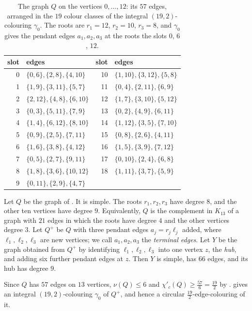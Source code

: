 \documentclass[11pt,colorlinks]{charlie}
\newcommand{\cind}{\chi'_c}
\begin{document}
\begin{table}[ht]
\centering\small
\begin{tabular}{@{}r l @{\qquad} r l@{}}
\toprule
slot & edges & slot & edges \\
\midrule
0 & $\{0,6\},\{2,8\},\{4,10\}$ & 10 & $\{1,10\},\{3,12\},\{5,8\}$ \\
1 & $\{1,9\},\{3,11\},\{5,7\}$ & 11 & $\{0,4\},\{2,11\},\{6,9\}$ \\
2 & $\{2,12\},\{4,8\},\{6,10\}$ & 12 & $\{1,7\},\{3,10\},\{5,12\}$ \\
3 & $\{0,3\},\{5,11\},\{7,9\}$ & 13 & $\{0,2\},\{4,9\},\{6,11\}$ \\
4 & $\{1,4\},\{6,12\},\{8,10\}$ & 14 & $\{1,12\},\{3,5\},\{7,10\}$ \\
5 & $\{0,9\},\{2,5\},\{7,11\}$ & 15 & $\{0,8\},\{2,6\},\{4,11\}$ \\
6 & $\{1,6\},\{3,8\},\{4,12\}$ & 16 & $\{1,5\},\{3,9\},\{7,12\}$ \\
7 & $\{0,5\},\{2,7\},\{9,11\}$ & 17 & $\{0,10\},\{2,4\},\{6,8\}$ \\
8 & $\{1,8\},\{3,6\},\{10,12\}$ & 18 & $\{1,11\},\{3,7\},\{5,9\}$ \\
9 & $\{0,11\},\{2,9\},\{4,7\}$ & & \\
\bottomrule
\end{tabular}
\caption{The graph $Q$ on the vertices $0,\dots,12$: its $57$ edges, arranged in the $19$ colour classes of the integral $(19,2)$-colouring $\gamma_0$. The roots are $r_1=12$, $r_2=10$, $r_3=8$, and $\gamma_0$ gives the pendant edges $a_1,a_2,a_3$ at the roots the slots $0$, $6$, $12$.}
\label{tab:core}
\end{table}

Let $Q$ be the graph of . It is simple. The roots $r_1,r_2,r_3$ have degree $8$, and the other ten vertices have degree $9$. Equivalently, $Q$ is the complement in $K_{13}$ of a graph with $21$ edges in which the roots have degree $4$ and the other vertices degree $3$. Let $Q^+$ be $Q$ with three pendant edges $a_j=r_j\ell_j$ added, where $\ell_1,\ell_2,\ell_3$ are new vertices; we call $a_1,a_2,a_3$ the \emph{terminal edges}. Let $Y$ be the graph obtained from $Q^+$ by identifying $\ell_1,\ell_2,\ell_3$ into one vertex $z$, the \emph{hub}, and adding six further pendant edges at $z$. Then $Y$ is simple, has $66$ edges, and its hub has degree $9$.

Since $Q$ has $57$ edges on $13$ vertices, $\nu(Q)\le6$ and $\cind(Q)\ge\frac{57}{6}=\frac{19}{2}$ by .  gives an integral $(19,2)$-colouring $\gamma_0$ of $Q^+$, and hence a circular $\frac{19}2$-edge-colouring of it.
\end{document}
